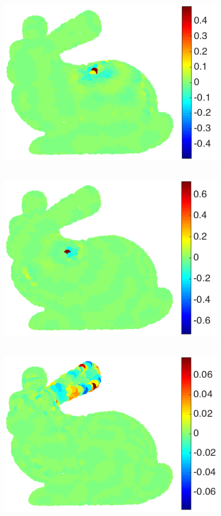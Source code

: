 \documentclass[journal, 10pt]{IEEEtran}
\begin{document}
\begin{figure}[bth]
\begin{minipage}[m]{0.16\linewidth}
\centerline{~~\includegraphics[width=.85\linewidth]{fig_bunny_atom_wav1a}}
\end{minipage}
\begin{minipage}[m]{0.16\linewidth}
\centerline{~~\includegraphics[width=.85\linewidth]{fig_bunny_atom_wav2a}}
\end{minipage}
\begin{minipage}[m]{0.16\linewidth}
\centerline{~~\includegraphics[width=.85\linewidth]{fig_bunny_atom_wav3a}}

\end{minipage}
\end{figure}
\end{document}
